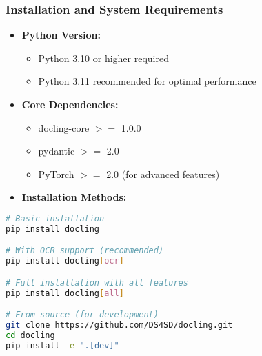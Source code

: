 \begin{frame}[fragile]\frametitle{Installation and System Requirements}
      \begin{itemize}
        \item \textbf{Python Version:}
        \begin{itemize}
            \item Python 3.10 or higher required
            \item Python 3.11 recommended for optimal performance
        \end{itemize}
        \item \textbf{Core Dependencies:}
        \begin{itemize}
            \item docling-core $>=$ 1.0.0
            \item pydantic $>=$ 2.0
            \item PyTorch $>=$ 2.0 (for advanced features)
        \end{itemize}		
        \item \textbf{Installation Methods:}
      \end{itemize}
      
\begin{lstlisting}[language=bash, basicstyle=\tiny]
# Basic installation
pip install docling

# With OCR support (recommended)
pip install docling[ocr]

# Full installation with all features
pip install docling[all]

# From source (for development)
git clone https://github.com/DS4SD/docling.git
cd docling
pip install -e ".[dev]"
\end{lstlisting}

\end{frame}

